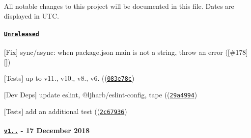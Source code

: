 All notable changes to this project will be documented in this file. Dates are displayed in U\+TC.

\paragraph*{\href{https://github.com/browserify/resolve/compare/v1.9.0...HEAD}{\tt Unreleased}}


\begin{DoxyItemize}
\item \mbox{[}Fix\mbox{]} {\ttfamily sync}/{\ttfamily async}\+: when package.\+json {\ttfamily main} is not a string, throw an error (\mbox{[}{\ttfamily \#178}\mbox{]}\mbox{[}\mbox{]})
\item \mbox{[}Tests\mbox{]} up to {\ttfamily v11.}, {\ttfamily v10.}, {\ttfamily v8.}, {\ttfamily v6.} ((\href{https://github.com/browserify/resolve/commit/083e78c1ae5c1708b7d41c9ad7c608caffeddcbf}{\tt {\ttfamily 083e78c}})
\item \mbox{[}Dev Deps\mbox{]} update {\ttfamily eslint}, {\ttfamily @ljharb/eslint-\/config}, {\ttfamily tape} ((\href{https://github.com/browserify/resolve/commit/29a499418d54b5befe9deef1bc7c38a9174cfbd8}{\tt {\ttfamily 29a4994}})
\item \mbox{[}Tests\mbox{]} add an additional test ((\href{https://github.com/browserify/resolve/commit/2c679363e852f7a0d570593527ea7038f0cd2c19}{\tt {\ttfamily 2c67936}})
\end{DoxyItemize}

\paragraph*{\href{https://github.com/browserify/resolve/compare/v1.8.1...v1.9.0}{\tt v1..} -\/ 17 December 2018}


